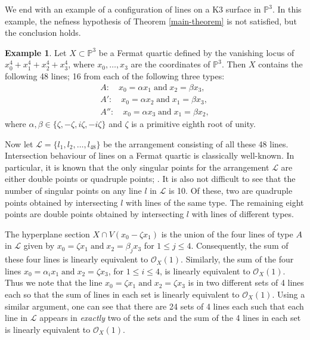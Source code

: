 \documentclass[12pt,reqno]{amsart}
\theoremstyle{plain}
\numberwithin{equation}{section}
\theoremstyle{definition}
\newtheorem{example}[theorem]{Example}
\begin{document}
We end with an example of a configuration of lines on a K3 surface in $\mathbb{P}^3$. In this example, the nefness hypothesis of Theorem \ref{main-theorem} is not satisfied, but the conclusion holds. 

\begin{example}\label{K3}
		Let $X \subset \mathbb{P}^3$ be a Fermat quartic defined by the vanishing locus of $x_0^4 + x_1^4 + x_2^4 + x_3^4$, where $x_0, \ldots, x_3$ are the coordinates of $\mathbb{P}^3$. 
		Then $X$ contains the following 48 lines; 
  16 from each of the following three types: 
		\begin{eqnarray*}
			A: \quad x_0 = \alpha x_1 \; \text{and} \; x_2 = \beta x_3, \\
			A': \quad x_0 = \alpha x_2 \; \text{and} \; x_1 = \beta x_3, \\
			A'': \quad x_0 = \alpha x_3 \; \text{and} \; x_1 = \beta x_2,
		\end{eqnarray*}
		where $\alpha, \beta \in \{\zeta, -\zeta, i\zeta, -i\zeta \}$ and $\zeta$ is a primitive eighth root of unity. %
		

Now let $\mathcal{L} = \{l_1,l_2, \ldots,  l_{48}\}$ be the arrangement consisting of all these 48 lines. 
Intersection behaviour of lines on a Fermat quartic is classically well-known. 
In particular, it is known that the only singular points for the arrangement $\mathcal{L}$ are either double points or quadruple points; \cite[Example 3.3]{Pok1}. It is also not difficult to see that the number of singular points on any line $l$ in $\mathcal{L}$ is 10. Of these, two are quadruple points obtained by intersecting $l$ with lines of the same type. The remaining eight points are double points obtained by intersecting $l$ with lines of different types. 


The hyperplane section $X \cap V(x_0 - \zeta x_1)$ is the union of the four lines of type $A$ in $\mathcal{L}$ 
given by  
$x_0 = \zeta x_1 \; \text{and} \; x_2 = \beta_j x_3$
for  $1\leq j \leq 4$. Consequently, the sum of these four lines is linearly equivalent to $\mathcal{O}_X(1)$. Similarly, the sum of the four lines 
$x_0 = \alpha_i x_1 \; \text{and} \; x_2 = \zeta x_3$, 
for $1\leq i \leq 4$, 
is linearly equivalent to $\mathcal{O}_X(1)$. Thus we note that the line 
$x_0 = \zeta x_1 \; \text{and} \; x_2 = \zeta x_3$ is in two different sets of 4 lines each so that the sum of lines in each set is linearly equivalent to $\mathcal{O}_X(1)$.
Using a similar argument, one can see that there are 24 sets of 4 lines each such that each line in $\mathcal{L}$ appears in \textit{exactly} two of the sets and the sum of the 4 lines in each set is linearly equivalent to $\mathcal{O}_X(1)$.



\end{example}
\end{document}
